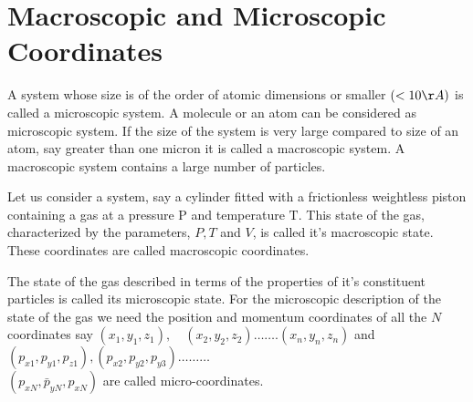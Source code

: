 \section{Macroscopic and Microscopic Coordinates}
A system whose size is of the order of atomic dimensions or smaller $(<10 \AA)$ is called a microscopic system. A molecule or an atom can be considered as microscopic system. If the size of the system is very large compared to size of an atom, say greater than one micron it is called a macroscopic system. A macroscopic system contains a large number of particles.
\par Let us consider a system, say a cylinder fitted with a frictionless weightless piston containing a gas at a pressure $\mathrm{P}$ and temperature $\mathrm{T}$. This state of the gas, characterized by the parameters, $P, T$ and $V$, is called it's macroscopic state. These coordinates are called macroscopic coordinates.
\par The state of the gas described in terms of the properties of it's constituent particles is called its microscopic state. For the microscopic description of the state of the gas we need the position and momentum coordinates of all the $N$ coordinates say $\left(x_{1}, y_{1}, z_{1}\right), \quad\left(x_{2}, y_{2}, z_{2}\right) \ldots \ldots .\left(x_{n}, y_{n}, z_{n}\right)$ and $\left(p_{x 1}, p_{y 1}, p_{z 1}\right),\left(p_{x 2}, p_{y 2}, p_{y 3}\right) \ldots \ldots \ldots$\\$\left(p_{x N}, \bar{p}_{y N}, p_{x N}\right)$ are called micro-coordinates.
